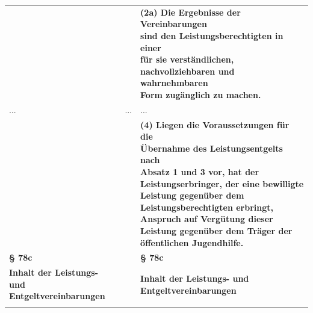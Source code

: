 \documentclass[10pt,a4paper,landscape]{article}
\begin{document}
\begin{longtable}{|L{8.2cm}|L{8.2cm}|L{8.2cm}|}
\hhline{|---|}
 &  & \textbf{\textcolor{diffgreen}{(2a) Die Ergebnisse der Vereinbarungen  \newline sind den Leistungsberechtigten in einer  \newline für sie verständlichen,  \newline nachvollziehbaren und wahrnehmbaren  \newline Form zugänglich zu machen.}} \\
\hhline{|---|}
... & ... & ... \\
\hhline{|---|}
 &  & \textbf{\textcolor{diffgreen}{(4) Liegen die Voraussetzungen für die  \newline Übernahme des Leistungsentgelts nach  \newline Absatz 1 und 3 vor, hat der  \newline Leistungserbringer, der eine bewilligte  \newline Leistung gegenüber dem  \newline Leistungsberechtigten erbringt,  \newline Anspruch auf Vergütung dieser  \newline Leistung gegenüber dem Träger der  \newline öffentlichen Jugendhilfe.}} \\
\hhline{|---|}
\textbf{\S{} 78c} &  & \textbf{\S{} 78c} \\
\hhline{|---|}
\textbf{Inhalt der Leistungs- und  \newline Entgeltvereinbarungen} &  & \textbf{Inhalt der Leistungs- und  \newline Entgeltvereinbarungen} \\
\hhline{|---|}

\end{longtable}
\end{document}
